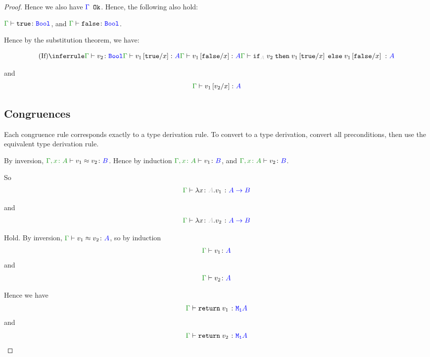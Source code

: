 \documentclass{report}
\begin{document}
\begin{framed}
\begin{proof}
            Hence we also have ${\color{blue} \Gamma} \texttt{ Ok}$. Hence, the following also hold:
        
            $\gtyperelation{\t}{\B}$, and $\gtyperelation{\f}{\B}$.
        
            Hence by the substitution theorem, we have:
        
            \begin{equation}
                \ntreeruleIII{If}{
                    \gtyperelation{v_2}{\B}
                }{
                    \gtyperelation{v_1\ssub{x}{\t}}{ A}
                }{
                    \gtyperelation{v_1\ssub{x}{\f}}{ A}
                }{\gtyperelation{\pifthenelse{A}{v_2}{v_1\ssub{x}{\t}}{v_1\ssub{x}{\f}}}{ A}
                }
            \end{equation}
        
            and 
            \begin{equation}
                \gtyperelation{v_1\ssub{x}{v_2}}{ A}
            \end{equation}
        
            
        
            \subsection{Congruences}
        Each congruence rule corresponds exactly to a type derivation rule. To convert to a type derivation, convert all preconditions, then use the equivalent type derivation rule.
        
            By inversion, $\berelation{\gax}{v_1}{v_2}{B}$. Hence by induction $\typerelation{\gax}{v_1}{B}$, and $\typerelation{\gax}{v_2}{B}$.
        
            So 
            \begin{equation}
                \gtyperelation{\lam{x}{A}{v_1}}{\ab}
            \end{equation}
        
            and
            \begin{equation}
                \gtyperelation{\lam{x}{A}{v_2}}{\ab}
            \end{equation}
        
            Hold.
            By inversion, $\gberelation{v_1}{v_2}{A}$, so by induction $$\gtyperelation{v_1}{A}$$ and $$\gtyperelation{v_2}{A}$$
        
            Hence we have $$\gtyperelation{\return{v_1}}{\moa}$$
            and
            $$\gtyperelation{\return{v_2}}{\moa}$$
        

\end{proof}
\end{framed}
\end{document}
